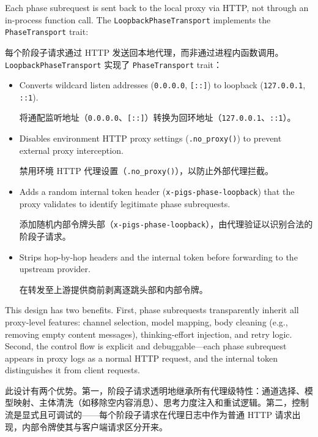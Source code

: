 Each phase subrequest is sent back to the local proxy via HTTP, not through an in-process function call. The \texttt{LoopbackPhaseTransport} implements the \texttt{PhaseTransport} trait:
\begin{chinese}
每个阶段子请求通过 HTTP 发送回本地代理，而非通过进程内函数调用。\texttt{LoopbackPhaseTransport} 实现了 \texttt{PhaseTransport} trait：
\end{chinese}

\begin{itemize}[nosep]
    \item Converts wildcard listen addresses (\texttt{0.0.0.0}, \texttt{[::]}) to loopback (\texttt{127.0.0.1}, \texttt{::1}).
    \begin{chinese}
    将通配监听地址（\texttt{0.0.0.0}、\texttt{[::]}）转换为回环地址（\texttt{127.0.0.1}、\texttt{::1}）。
    \end{chinese}
    \item Disables environment HTTP proxy settings (\texttt{.no\_proxy()}) to prevent external proxy interception.
    \begin{chinese}
    禁用环境 HTTP 代理设置（\texttt{.no\_proxy()}），以防止外部代理拦截。
    \end{chinese}
    \item Adds a random internal token header (\texttt{x-pigs-phase-loopback}) that the proxy validates to identify legitimate phase subrequests.
    \begin{chinese}
    添加随机内部令牌头部（\texttt{x-pigs-phase-loopback}），由代理验证以识别合法的阶段子请求。
    \end{chinese}
    \item Strips hop-by-hop headers and the internal token before forwarding to the upstream provider.
    \begin{chinese}
    在转发至上游提供商前剥离逐跳头部和内部令牌。
    \end{chinese}
\end{itemize}

This design has two benefits. First, phase subrequests transparently inherit all proxy-level features: channel selection, model mapping, body cleaning (e.g., removing empty content messages), thinking-effort injection, and retry logic. Second, the control flow is explicit and debuggable---each phase subrequest appears in proxy logs as a normal HTTP request, and the internal token distinguishes it from client requests.
\begin{chinese}
此设计有两个优势。第一，阶段子请求透明地继承所有代理级特性：通道选择、模型映射、主体清洗（如移除空内容消息）、思考力度注入和重试逻辑。第二，控制流是显式且可调试的——每个阶段子请求在代理日志中作为普通 HTTP 请求出现，内部令牌使其与客户端请求区分开来。
\end{chinese}

